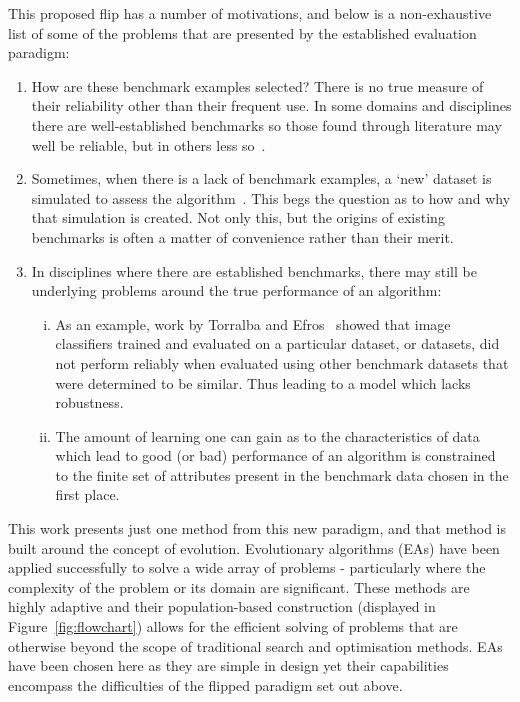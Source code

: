 \documentclass[smallextended]{svjour3}
\begin{document}
This proposed flip has a number of motivations, and below is a non-exhaustive
list of some of the problems that are presented by the established evaluation
paradigm:
\begin{enumerate}
    \item How are these benchmark examples selected? There is no true measure of
        their reliability other than their frequent use. In some domains and
        disciplines there are well-established benchmarks so those found through
        literature may well be reliable, but in others less
        so~\cite{Campos2016,UCRArchive2018,Wang2015}.
    \item Sometimes, when there is a lack of benchmark examples, a `new' dataset
        is simulated to assess the algorithm~\cite{Olson2017}. This begs the
        question as to how and why that simulation is created. Not only this,
        but the origins of existing benchmarks is often a matter of convenience
        rather than their merit.
    \item In disciplines where there are established benchmarks, there may still
        be underlying problems around the true performance of an algorithm:
        \begin{enumerate}[(i)]
            \item As an example, work by Torralba and Efros~\cite{Torralba2011}
                showed that image classifiers trained and evaluated on a
                particular dataset, or datasets, did not perform reliably when
                evaluated using other benchmark datasets that were determined
                to be similar. Thus leading to a model which lacks robustness.
            \item The amount of learning one can gain as to the characteristics
                of data which lead to good (or bad) performance of an algorithm
                is constrained to the finite set of attributes present in the
                benchmark data chosen in the first place.
        \end{enumerate}
\end{enumerate}

This work presents just one method from this new paradigm, and that method is
built around the concept of evolution. Evolutionary algorithms (EAs) have been
applied successfully to solve a wide array of problems \-- particularly where
the complexity of the problem or its domain are significant. These methods are
highly adaptive and their population-based construction (displayed in
Figure~\ref{fig:flowchart}) allows for the efficient solving of problems that
are otherwise beyond the scope of traditional search and optimisation methods.
EAs have been chosen here as they are simple in design yet their capabilities
encompass the difficulties of the flipped paradigm set out above.
\end{document}

